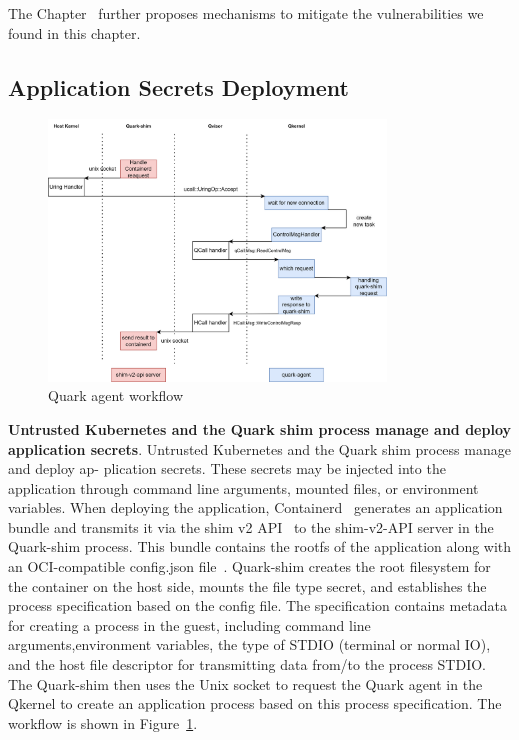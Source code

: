 The Chapter~\cite*{sec:design} further proposes mechanisms to mitigate the vulnerabilities we found in this chapter.


\subsection{Application Secrets Deployment}
\begin{figure}[htp]
    \centering
    \includegraphics[width=0.8\textwidth]{images/quark-agent-work-flow.png}
    \caption[Quark Agent Workflow]{Quark agent workflow}
    \label{fig:quark_agent_work_flow}
\end{figure}


\textbf{Untrusted Kubernetes and the Quark shim process manage and deploy application secrets}. 
Untrusted Kubernetes and the Quark shim process manage and deploy ap- plication secrets. These secrets may be injected into the application through command line arguments, mounted files, or environment variables. When deploying the application, Containerd~\cite*{containerd} generates an application 
bundle and transmits it via the shim v2 API~\cite*{shim_v2} to the shim-v2-API server in the Quark-shim process. This bundle contains the rootfs of the application along with an OCI-compatible config.json file~\cite*{oci-runtime-spec}. Quark-shim creates the root filesystem for the container on the host side, 
mounts the file type secret, and establishes the process specification based on the config file. The specification contains metadata for creating a process in the guest, including command line arguments,environment variables, the type of STDIO (terminal or normal IO), and the host file descriptor 
for transmitting data from/to the process STDIO. The Quark-shim then uses the Unix socket to request the Quark agent in the Qkernel to create an application process based on this process specification. The workflow is shown in Figure~\ref*{fig:quark_agent_work_flow}.

